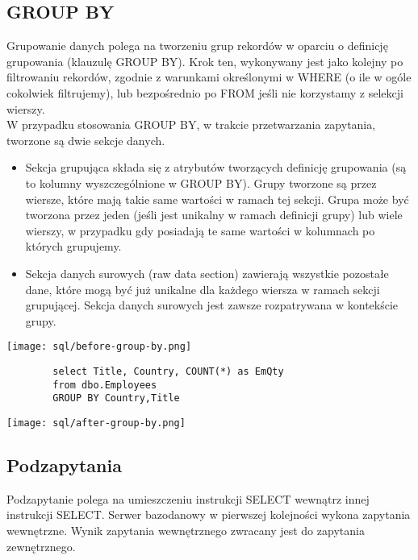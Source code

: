 \documentclass[main.tex]{subfiles}
\begin{document}
    \subsection{GROUP BY}
    Grupowanie danych polega na tworzeniu grup rekordów w oparciu o definicję grupowania (klauzulę GROUP BY). Krok ten, wykonywany jest jako kolejny po filtrowaniu rekordów, zgodnie z warunkami określonymi w WHERE (o ile w ogóle cokolwiek filtrujemy), lub bezpośrednio po FROM jeśli nie korzystamy z selekcji wierszy.
    \\
    W przypadku stosowania GROUP BY, w trakcie przetwarzania zapytania, tworzone są dwie sekcje danych.
    \begin{itemize}
        \item Sekcja grupująca składa się z atrybutów tworzących definicję grupowania (są to kolumny wyszczególnione w GROUP BY). Grupy tworzone są przez wiersze, które mają takie same wartości w ramach tej sekcji. Grupa może być tworzona przez jeden (jeśli jest unikalny w ramach definicji grupy) lub wiele wierszy, w przypadku gdy posiadają te same wartości w kolumnach po których grupujemy.
        \item Sekcja danych surowych (raw data section) zawierają wszystkie pozostałe dane, które mogą być już unikalne dla każdego wiersza w ramach sekcji grupującej. Sekcja danych surowych jest zawsze rozpatrywana w kontekście grupy.
    \end{itemize}
    \begin{center}
        \texttt{[image: sql/before-group-by.png]}
    \end{center}
    \begin{verbatim}
        select Title, Country, COUNT(*) as EmQty
        from dbo.Employees
        GROUP BY Country,Title
    \end{verbatim}
    \begin{center}
        \texttt{[image: sql/after-group-by.png]}
    \end{center}

    \subsection{Podzapytania}

    Podzapytanie polega na umieszczeniu instrukcji SELECT wewnątrz innej instrukcji SELECT. Serwer bazodanowy w pierwszej kolejności wykona zapytania wewnętrzne. Wynik zapytania wewnętrznego zwracany jest do zapytania zewnętrznego.
\end{document}
